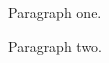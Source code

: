 \documentclass[11pt,a4paper,sans]{moderncv}
\begin{document}
Paragraph one.

Paragraph two.
\end{document}
